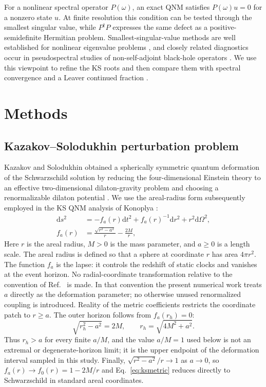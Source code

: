 \documentclass[12pt,a4paper]{article}
\newcommand{\dd}{\mathrm{d}}
\begin{document}
For a nonlinear spectral operator \(P(\omega)\), an exact QNM satisfies
\(P(\omega)u=0\) for a nonzero state \(u\). At finite resolution this condition
can be tested through the smallest singular value, while \(P^\dagger P\)
expresses the same defect as a positive-semidefinite Hermitian problem.
Smallest-singular-value methods are well established for nonlinear eigenvalue
problems \cite{Sadkane2023}, and closely related diagnostics occur in
pseudospectral studies of non-self-adjoint black-hole operators
\cite{Jaramillo2021,Cao2024}. We use this viewpoint to refine the KS roots and
then compare them with spectral convergence and a Leaver continued fraction
\cite{Leaver1985,Jansen2017}.

\section{Methods}

\subsection{Kazakov--Solodukhin perturbation problem}

Kazakov and Solodukhin obtained a spherically symmetric quantum deformation of
the Schwarzschild solution by reducing the four-dimensional Einstein theory to
an effective two-dimensional dilaton-gravity problem and choosing a
renormalizable dilaton potential \cite{Kazakov1994}.  We use the areal-radius
form subsequently employed in the KS QNM analysis of Konoplya
\cite{Konoplya2020}:
\begin{equation}
\begin{aligned}
\dd s^2 &=
-f_a(r)\dd t^2 + f_a(r)^{-1}\dd r^2
+ r^2 \dd\Omega^2,\\
f_a(r)&=\frac{\sqrt{r^2-a^2}}{r}-\frac{2M}{r},
\end{aligned}
\label{eq:ksmetric}
\end{equation}
Here \(r\) is the areal radius, \(M>0\) is the mass parameter, and \(a\geq0\)
is a length scale.  The areal radius is defined so that a sphere at coordinate
\(r\) has area \(4\pi r^2\).  The function \(f_a\) is the lapse: it controls
the redshift of static clocks and vanishes at the event horizon.  No radial-coordinate transformation relative to the
convention of Ref.~\cite{Konoplya2020} is made.  In that convention the
present numerical work treats \(a\) directly as the deformation parameter;
no otherwise unused renormalized coupling is introduced.  Reality of the metric coefficients restricts the
coordinate patch to \(r\geq a\).  The outer horizon follows from
\(f_a(r_h)=0\):
\begin{equation}
\sqrt{r_h^2-a^2}=2M,
\qquad
r_h=\sqrt{4M^2+a^2}.
\label{eq:horizonradius}
\end{equation}
Thus \(r_h>a\) for every finite \(a/M\), and the value \(a/M=1\) used below is
not an extremal or degenerate-horizon limit; it is the upper endpoint of the
deformation interval sampled in this study.  Finally,
\(\sqrt{r^2-a^2}/r\to1\) as \(a\to0\), so
\(f_a(r)\to f_0(r)=1-2M/r\) and Eq.~\eqref{eq:ksmetric} reduces directly to
Schwarzschild in standard areal coordinates.
\end{document}
